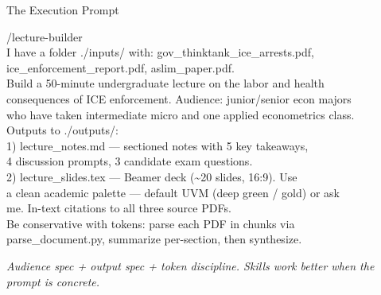 \documentclass[aspectratio=169, 10pt]{beamer}
\begin{document}
\begin{frame}[fragile]{The Execution Prompt}
\begin{tcolorbox}[promptboxsm]
{\color{CoolGray}\fontsize{5.5}{7}\selectfont\ttfamily /lecture-builder\\[2pt]
\color{white}\fontsize{5.5}{7}\selectfont\ttfamily
I have a folder ./inputs/ with: gov\_thinktank\_ice\_arrests.pdf,\\
ice\_enforcement\_report.pdf, aslim\_paper.pdf.\\[2pt]
Build a 50-minute undergraduate lecture on the labor and health\\
consequences of ICE enforcement. Audience: junior/senior econ majors\\
who have taken intermediate micro and one applied econometrics class.\\[2pt]
Outputs to ./outputs/:\\
\hspace*{1em}1) lecture\_notes.md --- sectioned notes with 5 key takeaways,\\
\hspace*{2em}4 discussion prompts, 3 candidate exam questions.\\
\hspace*{1em}2) lecture\_slides.tex --- Beamer deck (\textasciitilde 20 slides, 16:9). Use\\
\hspace*{2em}a clean academic palette --- default UVM (deep green / gold) or ask\\
\hspace*{2em}me. In-text citations to all three source PDFs.\\[2pt]
Be conservative with tokens: parse each PDF in chunks via\\
parse\_document.py, summarize per-section, then synthesize.
}
\end{tcolorbox}
\vskip3pt
\begin{center}
{\scriptsize\color{CoolGray}\textit{Audience spec + output spec + token discipline. Skills work better when the prompt is concrete.}}
\end{center}
\end{frame}
\end{document}
